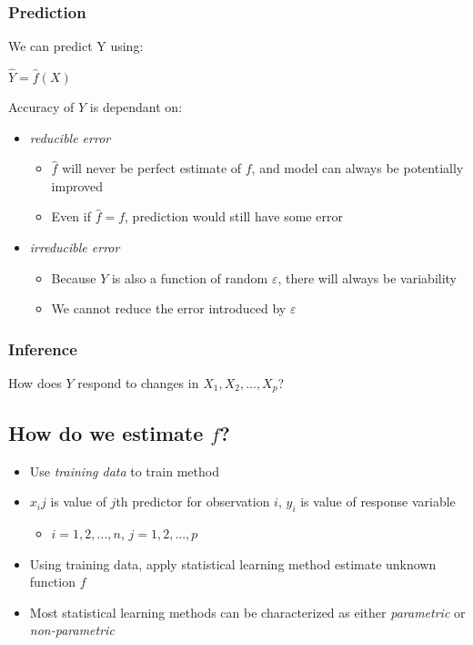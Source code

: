 \documentclass[]{book}
\providecommand{\tightlist}{%
  \setlength{\itemsep}{0pt}\setlength{\parskip}{0pt}}
\begin{document}
\hypertarget{prediction}{%
\subsubsection{Prediction}\label{prediction}}

We can predict Y using:

\(\hat{Y} = \hat{f}(X)\)

Accuracy of \(Y\) is dependant on:

\begin{itemize}
\tightlist
\item
  \emph{reducible error}

  \begin{itemize}
  \tightlist
  \item
    \(\hat{f}\) will never be perfect estimate of \(f\), and model can always be potentially improved
  \item
    Even if \(\hat{f} = f\), prediction would still have some error
  \end{itemize}
\item
  \emph{irreducible error}

  \begin{itemize}
  \tightlist
  \item
    Because \(Y\) is also a function of random \(ε\), there will always be variability
  \item
    We cannot reduce the error introduced by \(ε\)
  \end{itemize}
\end{itemize}

\hypertarget{inference}{%
\subsubsection{Inference}\label{inference}}

How does \(Y\) respond to changes in \(X_1, X_2, ..., X_p\)?

\hypertarget{how-do-we-estimate-f}{%
\subsection{\texorpdfstring{How do we estimate \emph{\(f\)}?}{How do we estimate f?}}\label{how-do-we-estimate-f}}

\begin{itemize}
\tightlist
\item
  Use \emph{training data} to train method
\item
  \(x_ij\) is value of \(j\)th predictor for observation \(i\), \(y_i\) is value of response variable

  \begin{itemize}
  \tightlist
  \item
    \(i = 1, 2, ..., n\), \(j = 1, 2, ..., p\)
  \end{itemize}
\item
  Using training data, apply statistical learning method estimate unknown function \(f\)
\item
  Most statistical learning methods can be characterized as either \emph{parametric} or \emph{non-parametric}
\end{itemize}
\end{document}
